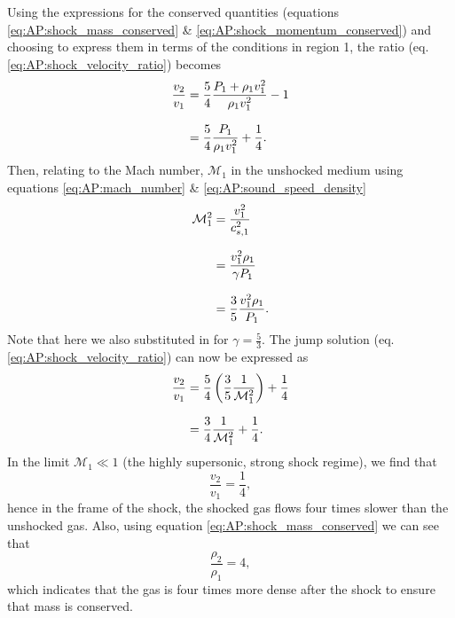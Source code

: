 %
Using the expressions for the conserved quantities (equations \ref{eq:AP:shock_mass_conserved} \& \ref{eq:AP:shock_momentum_conserved}) and choosing to express them in terms of the conditions in region 1, the ratio (eq. \ref{eq:AP:shock_velocity_ratio}) becomes
%
\begin{align*}
	\frac{v_2}{v_1} &= \frac{5}{4} \frac{P_1 + \rho_1 v_1^2}{\rho_1 v_1^2} - 1		
	\linedrop
	&= \frac{5}{4} \frac{P_1}{\rho_1 v_1^2} + \frac{1}{4}	.						
\end{align*}
%
Then, relating to the Mach number, \(\mathcal{M}_1\) in the unshocked medium using equations \ref{eq:AP:mach_number} \& \ref{eq:AP:sound_speed_density}
%
\begin{align*}
	\mathcal{M}_1^2 &= \frac{v_1^2}{c_{s,1}^2}
	\linedrop
	&= \frac{v_1^2 \rho_1}{\gamma P_1}
	\linedrop
	&= \frac{3}{5} \frac{v_1^2 \rho_1}{P_1}.
\end{align*}
%
Note that here we also substituted in for \(\gamma = \frac{5}{3}\).
 The jump solution (eq. \ref{eq:AP:shock_velocity_ratio}) can now be expressed as
%
\begin{align*}
	\frac{v_2}{v_1} &= \frac{5}{4} \left(\frac{3}{5} \frac{1}{\mathcal{M}_1^2}\right) + \frac{1}{4}
	\linedrop
	&= \frac{3}{4} \frac{1}{\mathcal{M}_1^2} + \frac{1}{4}.
\end{align*}
%
In the limit \(\mathcal{M}_1 \ll 1\) (the highly supersonic, strong shock regime), we find that
%
\begin{equation}
	\frac{v_2}{v_1} = \frac{1}{4},
	\label{eq:AP:strong_shock_velocity_ratio}
\end{equation}
%
hence in the frame of the shock, the shocked gas flows four times slower than the unshocked gas.
 Also, using equation \ref{eq:AP:shock_mass_conserved} we can see that
%
\begin{equation}
	\frac{\rho_2}{\rho_1} = 4,
	\label{eq:AP:strong_shock_density_ratio}
\end{equation}
%
which indicates that the gas is four times more dense after the shock to ensure that mass is conserved.







